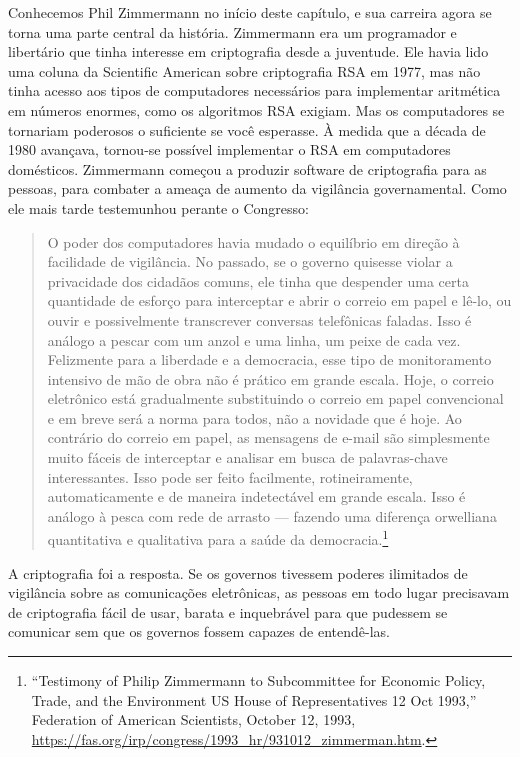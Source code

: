 \documentclass{book}
\begin{document}
Conhecemos Phil Zimmermann no início deste capítulo, e sua carreira agora se torna uma parte central da história. Zimmermann era um programador e libertário que tinha interesse em criptografia desde a juventude. Ele havia lido uma coluna da Scientific American sobre criptografia RSA em 1977, mas não tinha acesso aos tipos de computadores necessários para implementar aritmética em números enormes, como os algoritmos RSA exigiam. Mas os computadores se tornariam poderosos o suficiente se você esperasse. À medida que a década de 1980 avançava, tornou-se possível implementar o RSA em computadores domésticos. Zimmermann começou a produzir software de criptografia para as pessoas, para combater a ameaça de aumento da vigilância governamental. Como ele mais tarde testemunhou perante o Congresso:
\begin{quote}
    O poder dos computadores havia mudado o equilíbrio em direção à facilidade de vigilância. No passado, se o governo quisesse violar a privacidade dos cidadãos comuns, ele tinha que despender uma certa quantidade de esforço para interceptar e abrir o correio em papel e lê-lo, ou ouvir e possivelmente transcrever conversas telefônicas faladas. Isso é análogo a pescar com um anzol e uma linha, um peixe de cada vez. Felizmente para a liberdade e a democracia, esse tipo de monitoramento intensivo de mão de obra não é prático em grande escala. Hoje, o correio eletrônico está gradualmente substituindo o correio em papel convencional e em breve será a norma para todos, não a novidade que é hoje. Ao contrário do correio em papel, as mensagens de e-mail são simplesmente muito fáceis de interceptar e analisar em busca de palavras-chave interessantes. Isso pode ser feito facilmente, rotineiramente, automaticamente e de maneira indetectável em grande escala. Isso é análogo à pesca com rede de arrasto --- fazendo uma diferença orwelliana quantitativa e qualitativa para a saúde da democracia.\footnote{“Testimony of Philip Zimmermann to Subcommittee for Economic Policy, Trade, and the Environment US House of Representatives 12 Oct 1993,” Federation of American Scientists, October 12, 1993, \url{https://fas.org/irp/congress/1993_hr/931012_zimmerman.htm}.}
\end{quote}


A criptografia foi a resposta. Se os governos tivessem poderes ilimitados de vigilância sobre as comunicações eletrônicas, as pessoas em todo lugar precisavam de criptografia fácil de usar, barata e inquebrável para que pudessem se comunicar sem que os governos fossem capazes de entendê-las.
\end{document}
